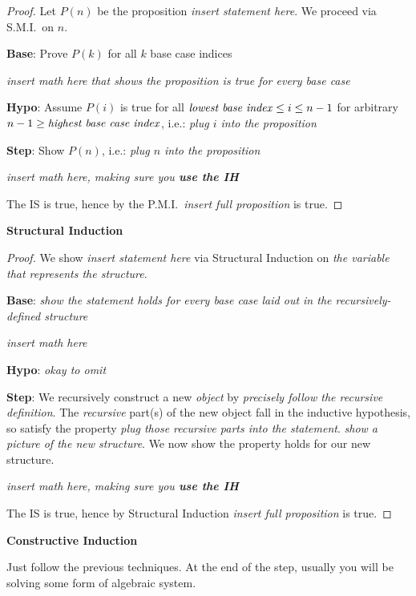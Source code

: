 \documentclass[main.tex]{subfiles}
\begin{document}
\begin{proof}
	Let \(P(n)\) be the proposition \textit{insert statement here}. We proceed via S.M.I.\ on \(n\).
	
	\textbf{Base}: Prove \(P(k)\) for all \(k\) base case indices
	
	\textit{insert math here that shows the proposition is true for every base case}
	
	\textbf{Hypo}: Assume \(P(i)\) is true for all \(\text{\textit{lowest base index}} \leq i \leq n-1\) for arbitrary \(n-1 \geq \text{\textit{highest base case index}}\), i.e.: \textit{plug \(i\) into the proposition}
	
	\textbf{Step}: Show \(P(n)\), i.e.: \textit{plug \(n\) into the proposition}
	
	\textit{insert math here, making sure you \textbf{use the IH}}
	
	The IS is true, hence by the P.M.I.\ \textit{insert full proposition} is true.
\end{proof}

\textbf{Structural Induction}

\begin{proof}
	We show \textit{insert statement here} via Structural Induction on \textit{the variable that represents the structure}.
	
	\textbf{Base}: \textit{show the statement holds for every base case laid out in the recursively-defined structure}
	
	\textit{insert math here}
	
	\textbf{Hypo}: \textit{okay to omit}
	
	\textbf{Step}: We recursively construct a new \textit{object} by \textit{precisely follow the recursive definition}. The \textit{recursive} part(s) of the new object fall in the inductive hypothesis, so satisfy the property \textit{plug those recursive parts into the statement}. \textit{show a picture of the new structure}. We now show the property holds for our new structure.
	
	\textit{insert math here, making sure you \textbf{use the IH}}
	
	The IS is true, hence by Structural Induction \textit{insert full proposition} is true.
\end{proof}

\textbf{Constructive Induction}

Just follow the previous techniques. At the end of the step, usually you will be solving some form of algebraic system.
\end{document}
